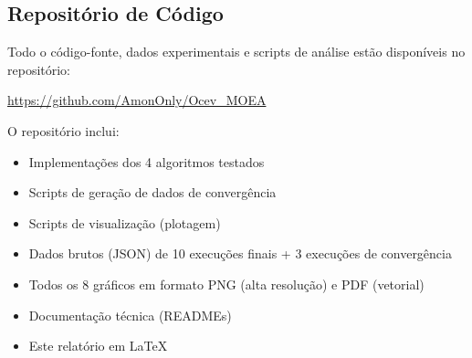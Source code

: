\subsection{Repositório de Código}

Todo o código-fonte, dados experimentais e scripts de análise estão disponíveis no repositório:

\begin{center}
\url{https://github.com/AmonOnly/Ocev_MOEA}
\end{center}

O repositório inclui:
\begin{itemize}
    \item Implementações dos 4 algoritmos testados
    \item Scripts de geração de dados de convergência
    \item Scripts de visualização (plotagem)
    \item Dados brutos (JSON) de 10 execuções finais + 3 execuções de convergência
    \item Todos os 8 gráficos em formato PNG (alta resolução) e PDF (vetorial)
    \item Documentação técnica (READMEs)
    \item Este relatório em LaTeX
\end{itemize}
